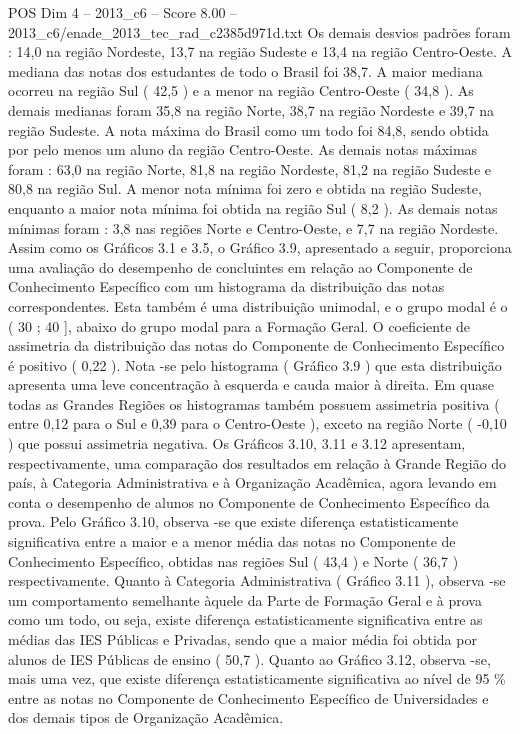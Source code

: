 \begin{textsample}{POS Dim 4 – 2013\_c6 – Score 8.00 – 2013\_c6/enade\_2013\_tec\_rad\_c2385d971d.txt}
Os demais desvios padrões foram : 14,0 na região Nordeste, 13,7 na região Sudeste e 13,4 na região Centro-Oeste.
A mediana das notas dos estudantes de todo o Brasil foi 38,7.
A maior mediana ocorreu na região Sul ( 42,5 ) e a menor na região Centro-Oeste ( 34,8 ).
As demais medianas foram 35,8 na região Norte, 38,7 na região Nordeste e 39,7 na região Sudeste.
A nota máxima do Brasil como um todo foi 84,8, sendo obtida por pelo menos um aluno da região Centro-Oeste.
As demais notas máximas foram : 63,0 na região Norte, 81,8 na região Nordeste, 81,2 na região Sudeste e 80,8 na região Sul.
A menor nota mínima foi zero e obtida na região Sudeste, enquanto a maior nota mínima foi obtida na região Sul ( 8,2 ).
As demais notas mínimas foram : 3,8 nas regiões Norte e Centro-Oeste, e 7,7 na região Nordeste.
Assim como os Gráficos 3.1 e 3.5, o Gráfico 3.9, apresentado a seguir, proporciona uma avaliação do desempenho de concluintes em relação ao Componente de Conhecimento Específico com um histograma da distribuição das notas correspondentes.
Esta também é uma distribuição unimodal, e o grupo modal é o ( 30 ; 40 ], abaixo do grupo modal para a Formação Geral.
O coeficiente de assimetria da distribuição das notas do Componente de Conhecimento Específico é positivo ( 0,22 ).
Nota -se pelo histograma ( Gráfico 3.9 ) que esta distribuição apresenta uma leve concentração à esquerda e cauda maior à direita.
Em quase todas as Grandes Regiões os histogramas também possuem assimetria positiva ( entre 0,12 para o Sul e 0,39 para o Centro-Oeste ), exceto na região Norte ( -0,10 ) que possui assimetria negativa.
Os Gráficos 3.10, 3.11 e 3.12 apresentam, respectivamente, uma comparação dos resultados em relação à Grande Região do país, à Categoria Administrativa e à Organização Acadêmica, agora levando em conta o desempenho de alunos no Componente de Conhecimento Específico da prova.
Pelo Gráfico 3.10, observa -se que existe diferença estatisticamente significativa entre a maior e a menor média das notas no Componente de Conhecimento Específico, obtidas nas regiões Sul ( 43,4 ) e Norte ( 36,7 ) respectivamente.
Quanto à Categoria Administrativa ( Gráfico 3.11 ), observa -se um comportamento semelhante àquele da Parte de Formação Geral e à prova como um todo, ou seja, existe diferença estatisticamente significativa entre as médias das IES Públicas e Privadas, sendo que a maior média foi obtida por alunos de IES Públicas de ensino ( 50,7 ).
Quanto ao Gráfico 3.12, observa -se, mais uma vez, que existe diferença estatisticamente significativa ao nível de 95 \% entre as notas no Componente de Conhecimento Específico de Universidades e dos demais tipos de Organização Acadêmica.

\end{textsample}
